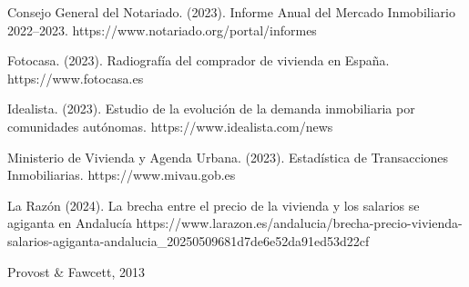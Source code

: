\documentclass[a4paper,11pt]{book}
\begin{document}
%
Consejo General del Notariado. (2023). Informe Anual del Mercado Inmobiliario 2022–2023. https://www.notariado.org/portal/informes

Fotocasa. (2023). Radiografía del comprador de vivienda en España. https://www.fotocasa.es

Idealista. (2023). Estudio de la evolución de la demanda inmobiliaria por comunidades autónomas. https://www.idealista.com/news

Ministerio de Vivienda y Agenda Urbana. (2023). Estadística de Transacciones Inmobiliarias. https://www.mivau.gob.es

La Razón (2024). La brecha entre el precio de la vivienda y los salarios se agiganta en Andalucía
https://www.larazon.es/andalucia/brecha-precio-vivienda-salarios-agiganta-andalucia_20250509681d7de6e52da91ed53d22cf


Provost & Fawcett, 2013

%
%
%
\end{document}
